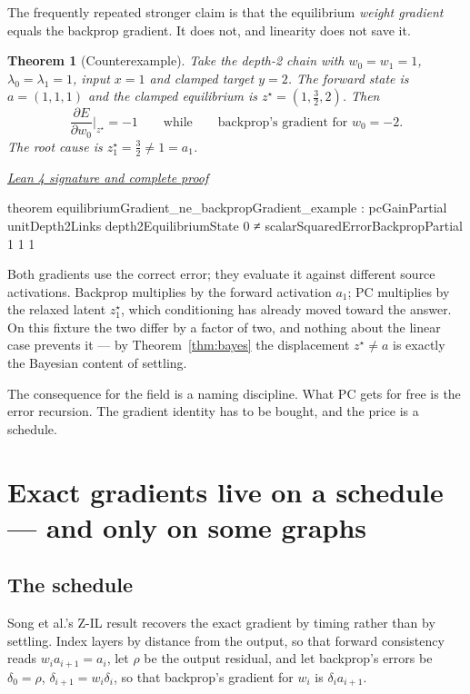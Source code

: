 \documentclass[11pt]{article}
\newtheorem{theorem}{Theorem}[section]
\newcommand{\leancommit}{f3a31db36bb2f944312ee31c1d86c2758109e83a}
\newcommand{\leansignaturelink}[2]{%
  \par\Needspace{0.3\textheight}\smallskip\noindent
  \href{https://github.com/zariuq/MeTTapedia/blob/\leancommit/#1\#L#2}{%
    \scriptsize\itshape Lean 4 signature and complete proof}\par\nobreak}
\begin{document}
The frequently repeated stronger claim is that the equilibrium \emph{weight gradient}
equals the backprop gradient. It does not, and linearity does not save it.

\begin{theorem}[Counterexample]\label{thm:gradne}
Take the depth-2 chain with $w_0 = w_1 = 1$, $\lambda_0 = \lambda_1 = 1$, input $x=1$
and clamped target $y=2$. The forward state is $a = (1,1,1)$ and the clamped equilibrium
is $z^\star = (1,\tfrac32,2)$. Then
\[
\frac{\partial E}{\partial w_0}\Big|_{z^\star} = -1
\qquad\text{while}\qquad
\text{backprop's gradient for } w_0 = -2 .
\]
The root cause is $z^\star_1 = \tfrac32 \neq 1 = a_1$.
\end{theorem}

\leansignaturelink{lean/mettapedia/Mettapedia/MachineLearning/NeuralNetworks/%
PredictiveCoding/BackpropExactness.lean}{101}
\begin{leansignature}
theorem equilibriumGradient_ne_backpropGradient_example :
    pcGainPartial unitDepth2Links depth2EquilibriumState 0 ≠
      scalarSquaredErrorBackpropPartial 1 1 1
\end{leansignature}

Both gradients use the correct error; they evaluate it against different source
activations. Backprop multiplies by the forward activation $a_1$; PC multiplies by the
relaxed latent $z^\star_1$, which conditioning has already moved toward the answer. On
this fixture the two differ by a factor of two, and nothing about the linear case
prevents it --- by Theorem~\ref{thm:bayes} the displacement $z^\star \neq a$ is exactly
the Bayesian content of settling.

The consequence for the field is a naming discipline. What PC gets for free is the error
recursion. The gradient identity has to be bought, and the price is a schedule.

\section{Exact gradients live on a schedule --- and only on some graphs}
\label{sec:schedule}

\subsection{The schedule}

Song et al.'s Z-IL result \cite{song2020} recovers the exact gradient by timing rather
than by settling. Index layers by distance from the output, so that forward consistency
reads $w_i a_{i+1} = a_i$, let $\rho$ be the output residual, and let backprop's errors
be $\delta_0 = \rho$, $\delta_{i+1} = w_i \delta_i$, so that backprop's gradient for
$w_i$ is $\delta_i a_{i+1}$.
\end{document}
